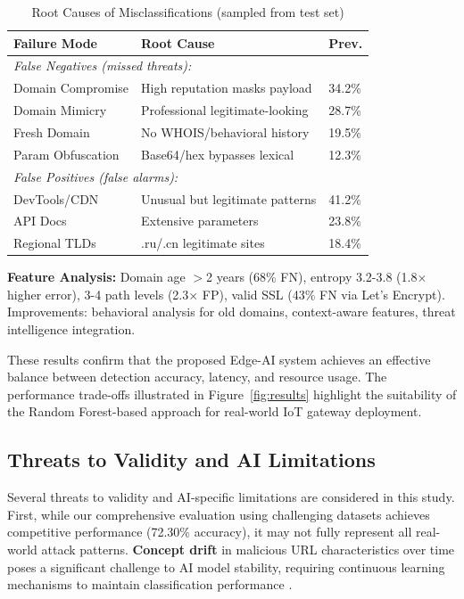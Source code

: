 \documentclass[conference]{IEEEtran}
\begin{document}
\begin{table}[htbp]
\centering
\caption{Root Causes of Misclassifications (sampled from test set)}
\label{tab:false_negatives}
{\footnotesize
\begin{tabular}{lp{3.5cm}l}
\toprule
Failure Mode & Root Cause & Prev. \\
\midrule
\multicolumn{3}{l}{\textit{False Negatives (missed threats):}} \\
Domain Compromise & High reputation masks payload & 34.2\% \\
Domain Mimicry & Professional legitimate-looking & 28.7\% \\
Fresh Domain & No WHOIS/behavioral history & 19.5\% \\
Param Obfuscation & Base64/hex bypasses lexical & 12.3\% \\
\midrule
\multicolumn{3}{l}{\textit{False Positives (false alarms):}} \\
DevTools/CDN & Unusual but legitimate patterns & 41.2\% \\
API Docs & Extensive parameters & 23.8\% \\
Regional TLDs & .ru/.cn legitimate sites & 18.4\% \\
\bottomrule
\end{tabular}
}
\end{table}

\textbf{Feature Analysis:} Domain age $>$2 years (68\% FN), entropy 3.2-3.8 (1.8× higher error), 3-4 path levels (2.3× FP), valid SSL (43\% FN via Let's Encrypt). Improvements: behavioral analysis for old domains, context-aware features, threat intelligence integration.

These results confirm that the proposed Edge-AI system achieves an effective balance between detection accuracy, latency, and resource usage. The performance trade-offs illustrated in Figure~\ref{fig:results} highlight the suitability of the Random Forest-based approach for real-world IoT gateway deployment.

\subsection{Threats to Validity and AI Limitations}

Several threats to validity and AI-specific limitations are considered in this study. First, while our comprehensive evaluation using challenging datasets achieves competitive performance (72.30\% accuracy), it may not fully represent all real-world attack patterns. \textbf{Concept drift} in malicious URL characteristics over time poses a significant challenge to AI model stability, requiring continuous learning mechanisms to maintain classification performance \cite{ref_concept_drift}.
\end{document}
